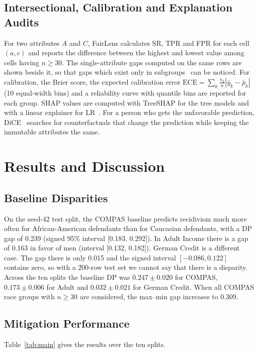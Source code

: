\documentclass[conference]{IEEEtran}
\begin{document}
\subsection{Intersectional, Calibration and Explanation Audits}
For two attributes $A$ and $C$, FairLens calculates SR, TPR and FPR for each cell $(a,c)$ and reports the difference between the highest and lowest value among cells having $n\ge30$. The single-attribute gaps computed on the same rows are shown beside it, so that gaps which exist only in subgroups~\cite{kearns2018preventing} can be noticed. For calibration, the Brier score, the expected calibration error $\mathrm{ECE}=\sum_k \frac{n_k}{n}|\bar{y}_k-\bar{p}_k|$ (10 equal-width bins) and a reliability curve with quantile bins are reported for each group. SHAP values are computed with TreeSHAP for the tree models and with a linear explainer for LR~\cite{lundberg2017unified}. For a person who gets the unfavorable prediction, DiCE~\cite{mothilal2020explaining} searches for counterfactuals that change the prediction while keeping the immutable attributes the same.

\section{Results and Discussion}\label{sec:results}
\subsection{Baseline Disparities}
On the seed-42 test split, the COMPAS baseline predicts recidivism much more often for African-American defendants than for Caucasian defendants, with a DP gap of 0.239 (signed 95\% interval [0.183, 0.292]). In Adult Income there is a gap of 0.163 in favor of men (interval [0.132, 0.182]). German Credit is a different case. The gap there is only 0.015 and the signed interval $[-0.086, 0.122]$ contains zero, so with a 200-row test set we cannot say that there is a disparity. Across the ten splits the baseline DP was $0.247\pm0.020$ for COMPAS, $0.173\pm0.006$ for Adult and $0.032\pm0.021$ for German Credit. When all COMPAS race groups with $n\ge30$ are considered, the max--min gap increases to 0.309.

\subsection{Mitigation Performance}
Table~\ref{tab:main} gives the results over the ten splits.
\end{document}
